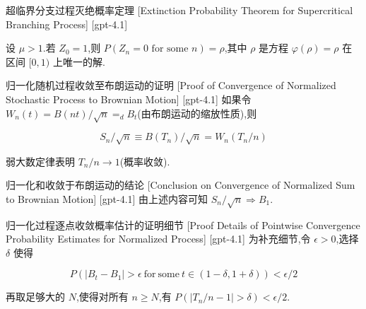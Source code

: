 \documentclass[UTF8]{ctexart}
\begin{document}
    
    
    \begin{thm}
        {超临界分支过程灭绝概率定理}
        [Extinction Probability Theorem for Supercritical Branching Process]
        [gpt-4.1]
        
设 $\mu > 1$.若 $Z_0 = 1$,则 $P(Z_n = 0 \text{ for some } n) = \rho$,其中 $\rho$ 是方程 $\varphi(\rho) = \rho$ 在区间 $[0, 1)$ 上唯一的解.

    \end{thm}
    
    
    
    \begin{prf}
        {归一化随机过程收敛至布朗运动的证明}
        [Proof of Convergence of Normalized Stochastic Process to Brownian Motion]
        [gpt-4.1]
        如果令 $W_n(t) = B(n t) / \sqrt{n} =_d B_t$(由布朗运动的缩放性质),则

\[
S_n / \sqrt{n} \equiv B(T_n) / \sqrt{n} = W_n( T_n / n )
\]

弱大数定律表明 $T_n / n \to 1$(概率收敛).

    \end{prf}
    
    
    
    \begin{crl}
        {归一化和收敛于布朗运动的结论}
        [Conclusion on Convergence of Normalized Sum to Brownian Motion]
        [gpt-4.1]
        由上述内容可知 $S_n / \sqrt{n} \Rightarrow B_1$.

    \end{crl}
    
    
    
    \begin{prf}
        {归一化过程逐点收敛概率估计的证明细节}
        [Proof Details of Pointwise Convergence Probability Estimates for Normalized Process]
        [gpt-4.1]
        为补充细节,令 $\epsilon > 0$,选择 $\delta$ 使得

\[
P( | B_t - B_1 | > \epsilon~\mathrm{for~some~} t \in ( 1 - \delta , 1 + \delta ) ) < \epsilon / 2
\]

再取足够大的 $N$,使得对所有 $n \geq N$,有 $P( | T_n / n - 1 | > \delta ) < \epsilon / 2$.

    \end{prf}
    
\end{document}
